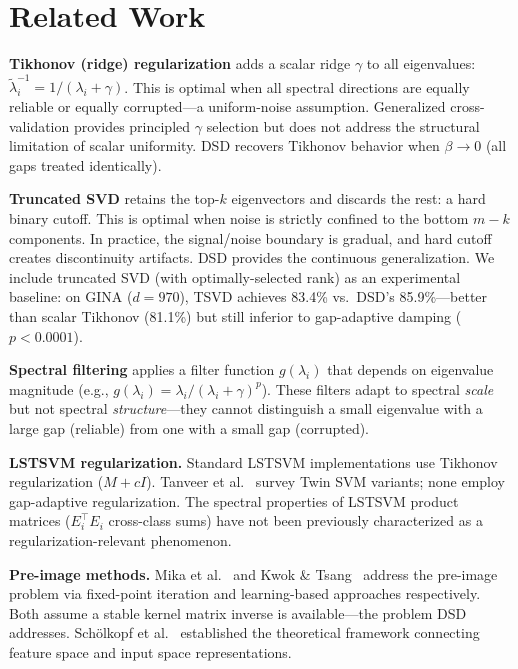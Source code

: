 \documentclass[journal]{IEEEtran}
\begin{document}
\section{Related Work}
\label{sec:related}

\textbf{Tikhonov (ridge) regularization} \cite{tikhonov1963solution} adds a scalar ridge $\gamma$ to all eigenvalues: $\tilde{\lambda}_i^{-1} = 1/(\lambda_i + \gamma)$. This is optimal when all spectral directions are equally reliable or equally corrupted---a uniform-noise assumption. Generalized cross-validation \cite{wahba1977practical} provides principled $\gamma$ selection but does not address the structural limitation of scalar uniformity. DSD recovers Tikhonov behavior when $\beta \to 0$ (all gaps treated identically).

\textbf{Truncated SVD} \cite{golub2013matrix} retains the top-$k$ eigenvectors and discards the rest: a hard binary cutoff. This is optimal when noise is strictly confined to the bottom $m{-}k$ components. In practice, the signal/noise boundary is gradual, and hard cutoff creates discontinuity artifacts. DSD provides the continuous generalization. We include truncated SVD (with optimally-selected rank) as an experimental baseline: on GINA ($d{=}970$), TSVD achieves 83.4\% vs.\ DSD's 85.9\%---better than scalar Tikhonov (81.1\%) but still inferior to gap-adaptive damping ($p < 0.0001$).

\textbf{Spectral filtering} \cite{engl1996regularization} applies a filter function $g(\lambda_i)$ that depends on eigenvalue magnitude (e.g., $g(\lambda_i) = \lambda_i/(\lambda_i + \gamma)^p$). These filters adapt to spectral \emph{scale} but not spectral \emph{structure}---they cannot distinguish a small eigenvalue with a large gap (reliable) from one with a small gap (corrupted).

\textbf{LSTSVM regularization.} Standard LSTSVM implementations \cite{kumar2009lstsvm, shao2011twinsvm} use Tikhonov regularization ($M + cI$). Tanveer et al.~\cite{tanveer2022comprehensive} survey Twin SVM variants; none employ gap-adaptive regularization. The spectral properties of LSTSVM product matrices ($E_i^\top E_i$ cross-class sums) have not been previously characterized as a regularization-relevant phenomenon.

\textbf{Pre-image methods.} Mika et al.~\cite{mika1999kernel} and Kwok \& Tsang~\cite{kwok2004preimage} address the pre-image problem via fixed-point iteration and learning-based approaches respectively. Both assume a stable kernel matrix inverse is available---the problem DSD addresses. Sch\"{o}lkopf et al.~\cite{scholkopf1999input} established the theoretical framework connecting feature space and input space representations.
\end{document}
